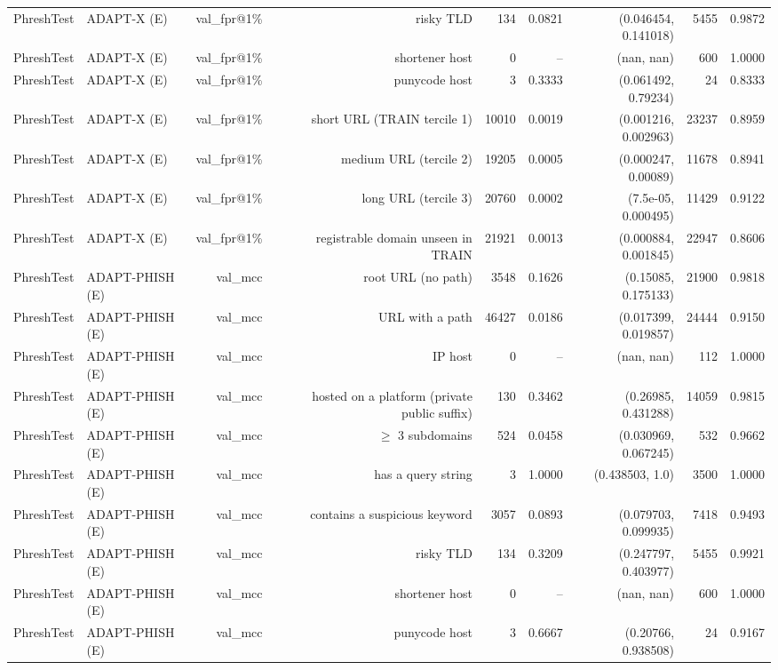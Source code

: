 \begin{table}[t]
\begin{tabular}{llrrrrrrr}
PhreshTest & ADAPT-X (E) & val\_fpr@1\% & risky TLD & 134 & 0.0821 & (0.046454, 0.141018) & 5455 & 0.9872 \\
PhreshTest & ADAPT-X (E) & val\_fpr@1\% & shortener host & 0 & -- & (nan, nan) & 600 & 1.0000 \\
PhreshTest & ADAPT-X (E) & val\_fpr@1\% & punycode host & 3 & 0.3333 & (0.061492, 0.79234) & 24 & 0.8333 \\
PhreshTest & ADAPT-X (E) & val\_fpr@1\% & short URL (TRAIN tercile 1) & 10010 & 0.0019 & (0.001216, 0.002963) & 23237 & 0.8959 \\
PhreshTest & ADAPT-X (E) & val\_fpr@1\% & medium URL (tercile 2) & 19205 & 0.0005 & (0.000247, 0.00089) & 11678 & 0.8941 \\
PhreshTest & ADAPT-X (E) & val\_fpr@1\% & long URL (tercile 3) & 20760 & 0.0002 & (7.5e-05, 0.000495) & 11429 & 0.9122 \\
PhreshTest & ADAPT-X (E) & val\_fpr@1\% & registrable domain unseen in TRAIN & 21921 & 0.0013 & (0.000884, 0.001845) & 22947 & 0.8606 \\
PhreshTest & ADAPT-PHISH (E) & val\_mcc & root URL (no path) & 3548 & 0.1626 & (0.15085, 0.175133) & 21900 & 0.9818 \\
PhreshTest & ADAPT-PHISH (E) & val\_mcc & URL with a path & 46427 & 0.0186 & (0.017399, 0.019857) & 24444 & 0.9150 \\
PhreshTest & ADAPT-PHISH (E) & val\_mcc & IP host & 0 & -- & (nan, nan) & 112 & 1.0000 \\
PhreshTest & ADAPT-PHISH (E) & val\_mcc & hosted on a platform (private public suffix) & 130 & 0.3462 & (0.26985, 0.431288) & 14059 & 0.9815 \\
PhreshTest & ADAPT-PHISH (E) & val\_mcc & $\geq$ 3 subdomains & 524 & 0.0458 & (0.030969, 0.067245) & 532 & 0.9662 \\
PhreshTest & ADAPT-PHISH (E) & val\_mcc & has a query string & 3 & 1.0000 & (0.438503, 1.0) & 3500 & 1.0000 \\
PhreshTest & ADAPT-PHISH (E) & val\_mcc & contains a suspicious keyword & 3057 & 0.0893 & (0.079703, 0.099935) & 7418 & 0.9493 \\
PhreshTest & ADAPT-PHISH (E) & val\_mcc & risky TLD & 134 & 0.3209 & (0.247797, 0.403977) & 5455 & 0.9921 \\
PhreshTest & ADAPT-PHISH (E) & val\_mcc & shortener host & 0 & -- & (nan, nan) & 600 & 1.0000 \\
PhreshTest & ADAPT-PHISH (E) & val\_mcc & punycode host & 3 & 0.6667 & (0.20766, 0.938508) & 24 & 0.9167 \\

\end{tabular}
\end{table}
